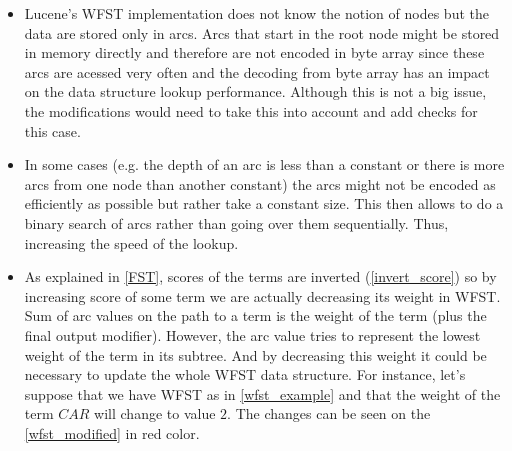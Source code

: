 \begin{itemize}
\begin{figure}[htbp]
        \caption{Comparison of memory usage when changing number encoding}
        \label{enc_comp}
    \end{figure}

    The memory usage increased by approximately $22\%$ for \textit{English words} dataset. However, it can be
    almost doubled as can be seen on \textit{Linux kernel} dataset where approximately $92\%$ size increase can be noticed.
    The graph \ref{enc_comp} also shows the case when the encoding would use \textit{long} datatype. Although Lucene's \textit{Lookup}
    interface specificies \textit{long} datatype, WFST implementation supports only \textit{int} so far.

    \item Lucene's WFST implementation does not know the notion of nodes but the data are stored only in arcs. Arcs that
    start in the root node might be stored in memory directly and therefore are not encoded in byte array since these
    arcs are acessed very often
    and the decoding from byte array has an impact on the data structure lookup performance. Although this is not a big issue,
    the modifications would need to take this into account and add checks for this case.

    \item In some cases (e.g. the depth of an arc is less than a constant or there is more arcs from one node than
    another constant) the arcs
    might not be encoded as efficiently as possible but rather take a constant size. This then allows to do a binary
    search of arcs rather than going over them sequentially. Thus, increasing the speed of the lookup.

    \item As explained in \ref{FST}, scores of the terms are inverted (\ref{invert_score}) so by increasing score of some term
    we are actually decreasing its weight in WFST. Sum of arc values on the path to a term is the weight of the term (plus the final output modifier).
    However, the arc value tries to represent the lowest weight of the term in its subtree. And by decreasing this weight
    it could be necessary to update the whole WFST data structure. For instance, let's suppose that we have WFST as in \ref{wfst_example}
    and that the weight of the term $CAR$ will change to value $2$. The changes can be seen on the \ref{wfst_modified} in red color.


\end{itemize}

